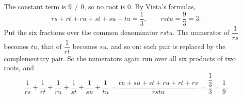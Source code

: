 The constant term is $9\ne0$, so no root is $0$. By Vieta's formulas,
\[rs+rt+ru+st+su+tu=\dfrac{1}{3},\qquad rstu=\dfrac{9}{3}=3.\]
Put the six fractions over the common denominator $rstu$. The numerator of $\dfrac{1}{rs}$ becomes $tu$, that of $\dfrac{1}{rt}$ becomes $su$, and so on: each pair is replaced by the complementary pair. So the numerators again run over all six products of two roots, and
\[\dfrac{1}{rs}+\dfrac{1}{rt}+\dfrac{1}{ru}+\dfrac{1}{st}+\dfrac{1}{su}+\dfrac{1}{tu}=\dfrac{tu+su+st+ru+rt+rs}{rstu}=\dfrac{\dfrac{1}{3}}{3}=\boxed{\dfrac{1}{9}}.\]
